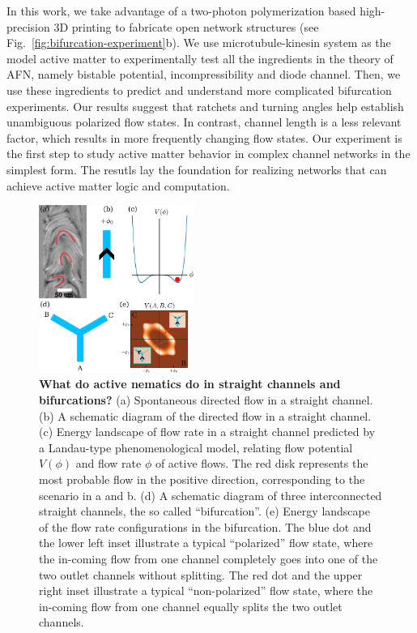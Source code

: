 \documentclass[%
10pt,
superscriptaddress,
twocolumn,
 amsmath,amssymb,
 aps,prx,
]{revtex4-2}
\begin{document}
In this work, we take advantage of a two-photon polymerization based high-precision 3D printing to fabricate open network structures (see Fig.~\ref{fig:bifurcation-experiment}b). 
We use microtubule-kinesin system as the model active matter to experimentally test all the ingredients in the theory of AFN, namely bistable potential, incompressibility and diode channel. 
Then, we use these ingredients to predict and understand more complicated bifurcation experiments.
Our results suggest that ratchets and turning angles help establish unambiguous polarized flow states.
In contrast, channel length is a less relevant factor, which results in more frequently changing flow states.
Our experiment is the first step to study active matter behavior in complex channel networks in the simplest form.
The resutls lay the foundation for realizing networks that can achieve active matter logic and computation.

  
\begin{figure}[!h]
    \includegraphics[width=0.45\textwidth]{1-bifurcation-question}
    \caption{
    \textbf{What do active nematics do in straight channels and bifurcations?}
    (a) Spontaneous directed flow in a straight channel.
    (b) A schematic diagram of the directed flow in a straight channel.
    (c) Energy landscape of flow rate in a straight channel predicted by a Landau-type phenomenological model, relating flow potential $V(\phi)$ and flow rate $\phi$ of active flows. 
    The red disk represents the most probable flow in the positive direction, corresponding to the scenario in a and b.
    (d) A schematic diagram of three interconnected straight channels, the so called ``bifurcation''.
    (e) Energy landscape of the flow rate configurations in the bifurcation. 
    The blue dot and the lower left inset illustrate a typical ``polarized'' flow state, where the in-coming flow from one channel completely goes into one of the two outlet channels without splitting. 
    The red dot and the upper right inset illustrate a typical ``non-polarized'' flow state, where the in-coming flow from one channel equally splits the two outlet channels. 
    }
    \label{fig:bifurcation-question}
\end{figure}
\end{document}
